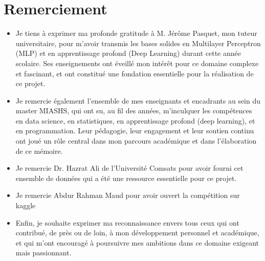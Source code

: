 {\vspace*{2cm}\large
\section*{Remerciement}
\begin{itemize}
\item Je tiens à exprimer ma profonde gratitude à M. Jérôme Pasquet, mon tuteur universitaire, pour m'avoir transmis les bases solides en Multilayer Perceptron (MLP) et en apprentissage profond (Deep Learning) durant cette année scolaire. Ses enseignements ont éveillé mon intérêt pour ce domaine complexe et fascinant, et ont constitué une fondation essentielle pour la réalisation de ce projet.

\item Je remercie également l'ensemble de mes enseignants et encadrants au sein du master MIASHS, qui ont su, au fil des années, m'inculquer les compétences en data science, en statistiques, en apprentissage profond (deep learning), et en programmation. Leur pédagogie, leur engagement et leur soutien continu ont joué un rôle central dans mon parcours académique et dans l'élaboration de ce mémoire.

\item Je remercie Dr. Hazrat Ali de l'Université Comsats pour avoir fourni cet ensemble de données qui a été une ressource essentielle pour ce projet. 

\item Je remercie Abdur Rahman Maud pour avoir ouvert la compétition sur kaggle

\item Enfin, je souhaite exprimer ma reconnaissance envers tous ceux qui ont contribué, de près ou de loin, à mon développement personnel et académique, et qui m'ont encouragé à poursuivre mes ambitions dans ce domaine exigeant mais passionnant.

\end{itemize}
}
\newpage